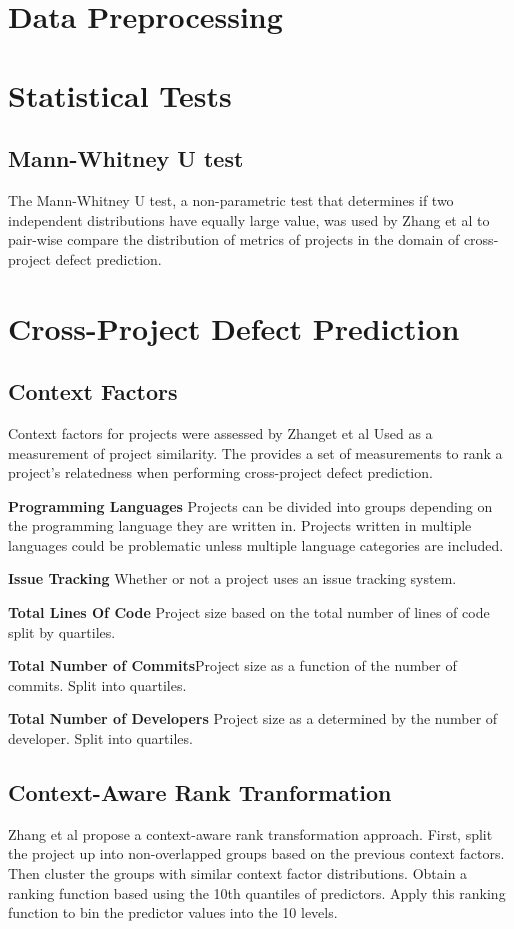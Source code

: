 \documentclass{sig-alternate-05-2015}
\begin{document}
\section{Data Preprocessing}

\section{Statistical Tests}
\subsection{Mann-Whitney U test}
The Mann-Whitney U test, a non-parametric test that determines if two independent distributions have equally large value,  was used by Zhang et al \cite{Zhang:2014:TBU:2597073.2597078} to pair-wise compare the distribution of metrics of projects in the domain of cross-project defect prediction.


\section{Cross-Project Defect Prediction}

\subsection{Context Factors}
Context factors for projects were assessed by Zhanget et al \cite{Zhang:2014:TBU:2597073.2597078}  Used as a measurement of project similarity. The provides a set of measurements to rank a project's relatedness when performing cross-project defect prediction.

\textbf{Programming Languages} Projects can be divided into groups depending on the programming language they are written in. Projects written in multiple languages could be problematic unless multiple language categories are included.

\textbf{Issue Tracking} Whether or not a project uses an issue tracking system.

\textbf{Total Lines Of Code} Project size based on the total number of lines of code split by quartiles.

\textbf{Total Number of Commits}Project size as a function of the number of commits. Split into quartiles.

\textbf{Total Number of Developers} Project size as a determined by the number of developer. Split into quartiles.

\subsection{Context-Aware Rank Tranformation}
Zhang et al \cite{Zhang:2014:TBU:2597073.2597078} propose a context-aware rank transformation approach. First, split the project up into non-overlapped groups based on the previous context factors. Then cluster the groups with similar context factor distributions. Obtain a ranking function based using the 10th quantiles of predictors. Apply this ranking function to bin the predictor values into the 10 levels.
\end{document}
